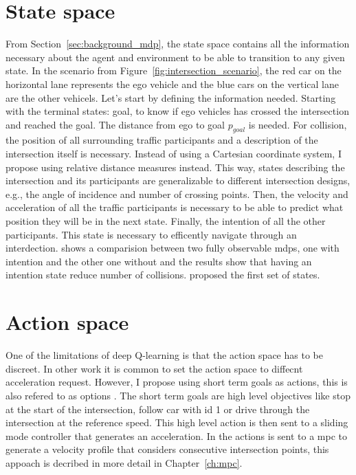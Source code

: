 \section{State space}
From Section~\ref{sec:background_mdp}, the state space contains all the information necessary about the agent and environment to be able to transition to any given state. In the scenario from Figure~\ref{fig:intersection_scenario}, the red car on the horizontal lane represents the ego vehicle and the blue cars on the vertical lane are the other vehicels. 
Let's start by defining the information needed. Starting with the terminal states: goal, to know if ego vehicles has crossed the intersection and reached the goal. The distance from ego to goal $p_{goal}$ is needed. For collision, the position of all surrounding traffic participants and a description of the intersection itself is necessary. Instead of using a Cartesian coordinate system, I propose using relative distance measures instead. This way, states describing the intersection and its participants are generalizable to different intersection designs, e.g., the angle of incidence and number of crossing points. 
Then, the velocity and acceleration of all the traffic participants is necessary to be able to predict what position they will be in the next state. Finally, the intention of all the other participants. This state is necessary to efficently navigate through an interdection. \paperBelief shows a comparision between two fully observable \gls{mdp}s, one with intention and the other one without and the results show that having an intention state reduce number of collisions. 
\paperLSTM proposed the first set of states. %

\section{Action space}
One of the limitations of deep Q-learning is that the action space has to be discreet. In other work it is common to set the action space to diffecnt acceleration request. However, I propose using short term goals as actions, this is also refered to as options \cite{options}. The short term goals are high level objectives like stop at the start of the intersection, follow car with id 1 or drive through the intersection at the reference speed. 
This high level action is then sent to a sliding mode controller that generates an acceleration. 
In \paperMPC the actions is sent to a \gls{mpc} to generate a velocity profile that considers consecutive intersection points, this appoach is decribed in more detail in Chapter~\ref{ch:mpc}.  

